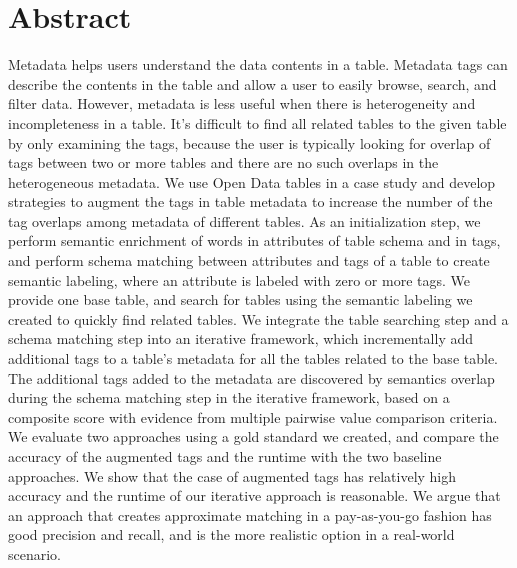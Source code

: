 
\chapter{Abstract}
Metadata helps users understand the data contents in a table. Metadata tags can describe the contents in the table and allow a user to easily browse, search, and filter data. However, metadata is less useful when there is heterogeneity and incompleteness in a table. It's difficult to find all related tables to the given table by only examining the tags, because the user is typically looking for overlap of tags between two or more tables and there are no such overlaps in the heterogeneous metadata. We use Open Data tables in a case study and develop strategies to augment the tags in table metadata to increase the number of the tag overlaps among metadata of different tables. As an initialization step, we perform semantic enrichment of words in attributes of table schema and in tags, and perform schema matching between attributes and tags of a table to create semantic labeling, where an attribute is labeled with zero or more tags. We provide one base table, and search for tables using the semantic labeling we created to quickly find related tables. We integrate the table searching step and a schema matching step into an iterative framework, which incrementally add additional tags to a table’s metadata for all the tables related to the base table. The additional tags added to the metadata are discovered by semantics overlap during the schema matching step in the iterative framework, based on a composite score with evidence from multiple pairwise value comparison criteria. We evaluate two approaches using a gold standard we created, and compare the accuracy of the augmented tags and the runtime with the two baseline approaches. We show that the case of augmented tags has relatively high accuracy and the runtime of our iterative approach is reasonable. We argue that an approach that creates approximate matching in a pay-as-you-go fashion has good precision and recall, and is the more realistic option in a real-world scenario.
\endinput